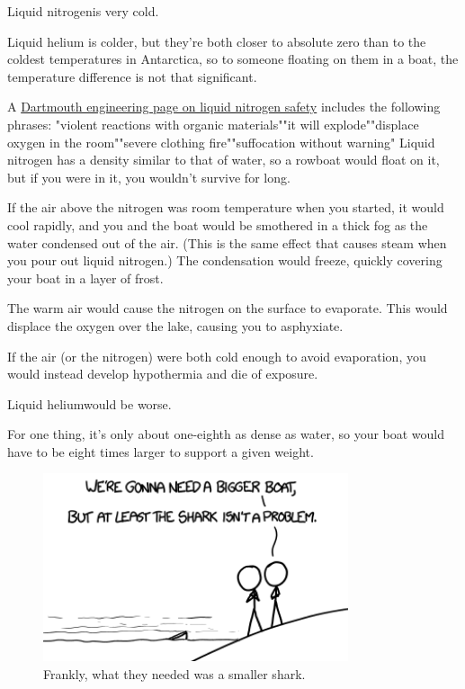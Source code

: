 {{Liquid nitrogenis very cold.}

{Liquid helium is colder, but they're both closer to absolute zero than to the coldest temperatures in Antarctica, so to someone floating on them in a boat, the temperature difference is not that significant.}

{A \href{http://engineering.dartmouth.edu/microeng/ln2.html}{Dartmouth engineering page on liquid nitrogen safety} includes the following phrases:}
"violent reactions with organic materials""it will explode""displace oxygen in the room""severe clothing fire""suffocation without warning"
{Liquid nitrogen has a density similar to that of water, so a rowboat would float on it, but if you were in it, you wouldn't survive for long.}

{If the air above the nitrogen was room temperature when you started, it would cool rapidly, and you and the boat would be smothered in a thick fog as the water condensed out of the air. (This is the same effect that causes steam when you pour out liquid nitrogen.) The condensation would freeze, quickly covering your boat in a layer of frost.}

{The warm air would cause the nitrogen on the surface to evaporate. This would displace the oxygen over the lake, causing you to asphyxiate.}

{If the air (or the nitrogen) were both cold enough to avoid evaporation, you would instead develop hypothermia and die of exposure.}

{Liquid heliumwould be worse.}

{For one thing, it's only about one-eighth as dense as water, so your boat would have to be eight times larger to support a given weight.}

\begin{figure}[!htbp]
\centering
\includegraphics[scale=0.5, max width=0.8\textwidth]{imgs/a/50/boat_large.png}
\caption{Frankly, what they needed was a smaller shark.}
\end{figure}

}
